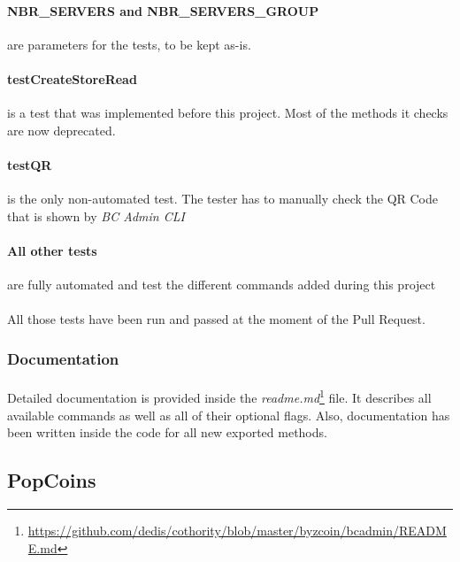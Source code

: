 \paragraph{NBR\_SERVERS and NBR\_SERVERS\_GROUP} are parameters for the tests, to be kept as-is.

\paragraph{testCreateStoreRead} is a test that was implemented before this project. Most of the methods it checks are now deprecated.

\paragraph{testQR} is the only non-automated test. The tester has to manually check the QR Code that is shown by \textit{BC Admin CLI}

\paragraph{All other tests} are fully automated and test the different commands added during this project

\paragraph{}

All those tests have been run and passed at the moment of the Pull Request.

\subsubsection{Documentation}

\paragraph{}

Detailed documentation is provided inside the \textit{readme.md}\footnote{\url{https://github.com/dedis/cothority/blob/master/byzcoin/bcadmin/README.md}} file. It describes all available commands as well as all of their optional flags. Also, documentation has been written inside the code for all new exported methods.

\subsection{PopCoins}

